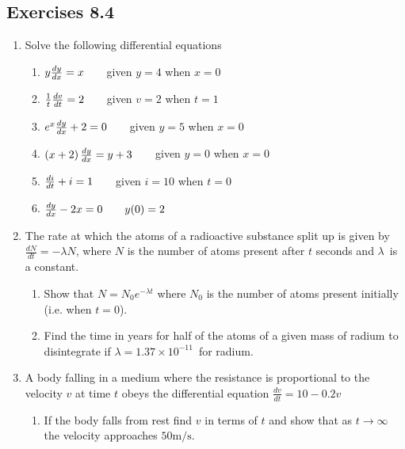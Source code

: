 \subsection{Exercises 8.4}
\begin{enumerate}
\item Solve the following differential equations 


\begin{enumerate}
\item $y \frac{d y}{d x} =x\text{\quad \quad }$given $y =4$ when $x =0$ 

\item $\frac{1}{t} \frac{d v}{d t} =2\text{\quad \quad }$given $v =2$ when $t =1$ 

\item $e^{x} \frac{d y}{d x} +2 =0\text{\quad \quad }$given $y =5$ when $x =0$ 

\item $\left (x +2\right ) \frac{d y}{d x} =y +3\text{\quad \quad }$given $y =0$ when $x =0$ 

\item $\frac{d i}{d t} +i =1\text{\quad \quad }$given $i =10$ when $t =0$ 

\item $\frac{d y}{d x} -2 x =0\text{\quad \quad }y (0) =2$ \end{enumerate}


\item The rate at which the atoms
of a radioactive substance split up is given by $\frac{d N}{d t} = -\lambda  N\text{,}$ where $N$ is the number of atoms present after $t$ seconds and $\lambda $\ is a constant. 


\begin{enumerate}
\item Show that $N =N_{0} e^{ -\lambda  t}$ where $N_{0}$ is the number of atoms present initially (i.e. when $t =0$). 

\item Find the time in years for half of the atoms of a given mass of
radium to disintegrate if $\lambda  =1.37 \times 10^{ -11}$\ for radium. \end{enumerate}


\item A
body falling in a medium where the resistance is proportional to the velocity $v$ at time $t$ obeys the differential equation $\frac{d v}{d t} =10 -0.2 v$ 


\begin{enumerate}
\item If the body falls from rest find $v$ in terms of $t$ and show that as $t \rightarrow \infty $ the velocity approaches $50 \mathrm{m}/\mbox{s}$. 


\end{enumerate}
\end{enumerate}

